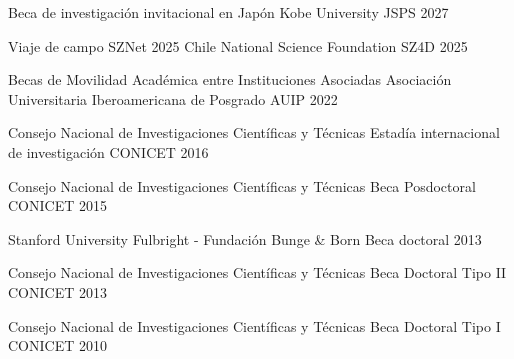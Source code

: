 



\begin{cvhonors}


\cvhonor
    {Beca de investigación invitacional en Japón} %
    {Kobe University} %
    {JSPS} %
    {2027} %

\cvhonor
    {Viaje de campo SZNet 2025 Chile} %
    {National Science Foundation} %
    {SZ4D} %
    {2025} %

\cvhonor
    {Becas de Movilidad Académica entre Instituciones Asociadas} %
    {Asociación Universitaria Iberoamericana de Posgrado} %
    {AUIP} %
    {2022} %
    

\cvhonor
    {Consejo Nacional de Investigaciones Científicas y Técnicas}
    {Estadía internacional de investigación}
    {CONICET}
    {2016}
    

\cvhonor
    {Consejo Nacional de Investigaciones Científicas y Técnicas}
    {Beca Posdoctoral}
    {CONICET}
    {2015}
    

\cvhonor
    {Stanford University}
    {Fulbright - Fundación Bunge \& Born}
    {Beca doctoral}
    {2013}
    

\cvhonor
   {Consejo Nacional de Investigaciones Científicas y Técnicas}
    {Beca Doctoral Tipo II}
    {CONICET}
    {2013}
    

\cvhonor
  {Consejo Nacional de Investigaciones Científicas y Técnicas}
    {Beca Doctoral Tipo I}
    {CONICET}
    {2010}
    




\end{cvhonors}
